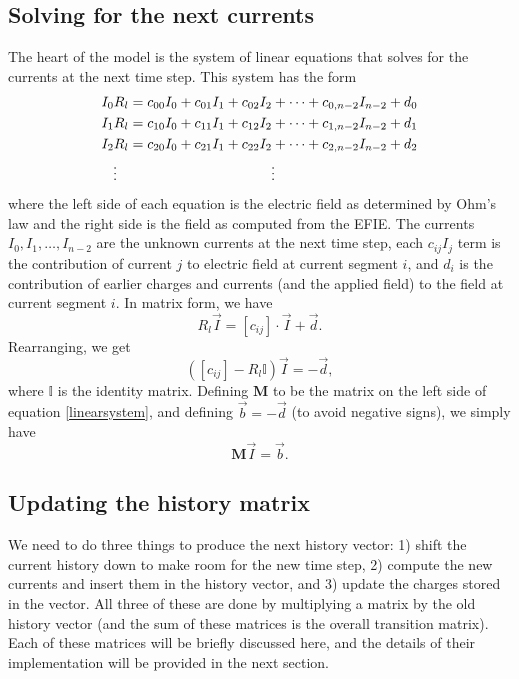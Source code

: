\documentclass{article}
\newcommand{\mat}{\mathbf}
\begin{document}
\subsection{Solving for the next currents}

The heart of the model is the system of linear equations that solves for the currents at the next time step. This system has the form
\begin{align}
\begin{split}
I_0R_l &= c_{00}I_0 + c_{01}I_1 + c_{02}I_2 + \cdots + c_{0,n-2}I_{n-2} + d_0 \\
I_1R_l &= c_{10}I_0 + c_{11}I_1 + c_{12}I_2 + \cdots + c_{1,n-2}I_{n-2} + d_1 \\
I_2R_l &= c_{20}I_0 + c_{21}I_1 + c_{22}I_2 + \cdots + c_{2,n-2}I_{n-2} + d_2 \\
\vdotswithin{I_2R_l} & \vdotswithin{= c_{20}I_0 + c_{21}I_1 + c_{22}I_2 + \cdots + c_{2,n-2}I_{n-2} + d_2}
\end{split}
\end{align}
where the left side of each equation is the electric field as determined by Ohm's law and the right side is the field as computed from the EFIE. The currents $I_0, I_1, \ldots, I_{n-2}$ are the unknown currents at the next time step, each $c_{ij}I_j$ term is the contribution of current $j$ to electric field at current segment $i$, and $d_i$ is the contribution of earlier charges and currents (and the applied field) to the field at current segment $i$. In matrix form, we have
\begin{equation}
R_l\vec{I} = \left[c_{ij}\right] \cdot \vec{I} + \vec{d}.
\end{equation}
Rearranging, we get
\begin{equation}
\label{linearsystem}
\left(\left[c_{ij}\right] - R_l\mathbb{I}\right) \vec{I} = -\vec{d},
\end{equation}
where $\mathbb{I}$ is the identity matrix. Defining $\mat{M}$ to be the matrix on the left side of equation \ref{linearsystem}, and defining $\vec{b} = -\vec{d}$ (to avoid negative signs), we simply have
\begin{equation}
\label{mib}
\mat{M} \vec{I} = \vec{b}.
\end{equation}

\subsection{Updating the history matrix}
We need to do three things to produce the next history vector: 1) shift the current history down to make room for the new time step, 2) compute the new currents and insert them in the history vector, and 3) update the charges stored in the vector. All three of these are done by multiplying a matrix by the old history vector (and the sum of these matrices is the overall transition matrix). Each of these matrices will be briefly discussed here, and the details of their implementation will be provided in the next section.
\end{document}
